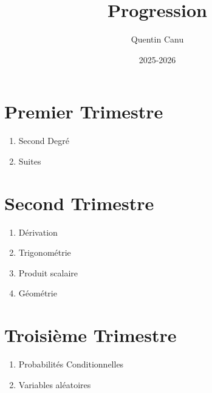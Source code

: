 \documentclass{article}
\title{Progression}
\author{Quentin Canu}
\date{2025-2026}
\begin{document}
\maketitle
\section{Premier Trimestre}
\begin{enumerate}
\item Second Degré
\item Suites
\end{enumerate}
\section{Second Trimestre}
\begin{enumerate}[resume]
\item Dérivation
\item Trigonométrie
\item Produit scalaire
\item Géométrie
\end{enumerate}
\section{Troisième Trimestre}
\begin{enumerate}[resume]
\item Probabilités Conditionnelles
\item Variables aléatoires
\end{enumerate}
\end{document}
